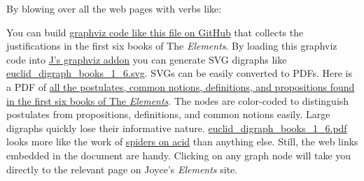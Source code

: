 By blowing over all the web pages with verbs like:

\begin{Shaded}
\begin{Highlighting}[]
\KeywordTok{=:} 


\KeywordTok{;}\RegionMarkerTok{(}\RegionMarkerTok{)} 
\RegionMarkerTok{)}
\end{Highlighting}
\end{Shaded}

You can build
\href{https://github.com/bakerjd99/jacks/blob/master/eucgvuts/euclid_digraph_books_1_6.gv}{graphviz
code like this file on GitHub} that collects the justifications in the
first six books of The \emph{Elements}. By loading this graphviz code
into \href{https://wiki.jsoftware.com/wiki/Addons/graphics/graphviz}{J's
graphviz addon} you can generate SVG digraphs like
\href{https://github.com/bakerjd99/jacks/blob/master/eucgvuts/euclid_digraph_books_1_6.svg}{euclid\_digraph\_books\_1\_6.svg}.
SVGs can be easily converted to PDFs. Here is a PDF of
\href{https://bakerjd99.files.wordpress.com/2023/06/euclid_digraph_books_1_6.pdf}{all
the postulates, common notions, definitions, and propositions found in
the first six books of The \emph{Elements}}. The nodes are color-coded
to distinguish postulates from propositions, definitions, and common
notions easily. Large digraphs quickly lose their informative nature.
\href{https://bakerjd99.files.wordpress.com/2023/06/euclid_digraph_books_1_6.pdf}{euclid\_digraph\_books\_1\_6.pdf}
looks more like the work of
\href{https://www.theguardian.com/science/2014/oct/04/spiders-lsd-drugs-experiment-1971}{spiders
on acid} than anything else. Still, the web links embedded in the
document are handy. Clicking on any graph node will take you directly to
the relevant page on Joyce's \emph{Elements} site.

